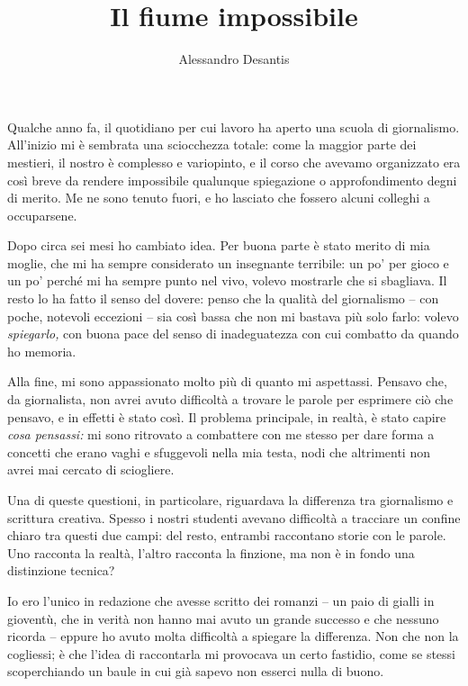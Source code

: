 \documentclass[12pt]{book}
\begin{document}
\title{Il fiume impossibile}
\author{Alessandro Desantis}
\date{}
\maketitle

\cleardoublepage

Qualche anno fa, il quotidiano per cui lavoro ha aperto una scuola di giornalismo. All'inizio mi è sembrata una sciocchezza totale: come la maggior parte dei mestieri, il nostro è complesso e variopinto, e il corso che avevamo organizzato era così breve da rendere impossibile qualunque spiegazione o approfondimento degni di merito. Me ne sono tenuto fuori, e ho lasciato che fossero alcuni colleghi a occuparsene.

Dopo circa sei mesi ho cambiato idea. Per buona parte è stato merito di mia moglie, che mi ha sempre considerato un insegnante terribile: un po' per gioco e un po' perché mi ha sempre punto nel vivo, volevo mostrarle che si sbagliava. Il resto lo ha fatto il senso del dovere: penso che la qualità del giornalismo -- con poche, notevoli eccezioni -- sia così bassa che non mi bastava più solo farlo: volevo \emph{spiegarlo,} con buona pace del senso di inadeguatezza con cui combatto da quando ho memoria.

Alla fine, mi sono appassionato molto più di quanto mi aspettassi. Pensavo che, da giornalista, non avrei avuto difficoltà a trovare le parole per esprimere ciò che pensavo, e in effetti è stato così. Il problema principale, in realtà, è stato capire \emph{cosa pensassi:} mi sono ritrovato a combattere con me stesso per dare forma a concetti che erano vaghi e sfuggevoli nella mia testa, nodi che altrimenti non avrei mai cercato di sciogliere.

Una di queste questioni, in particolare, riguardava la differenza tra giornalismo e scrittura creativa. Spesso i nostri studenti avevano difficoltà a tracciare un confine chiaro tra questi due campi: del resto, entrambi raccontano storie con le parole. Uno racconta la realtà, l'altro racconta la finzione, ma non è in fondo una distinzione tecnica?

Io ero l'unico in redazione che avesse scritto dei romanzi -- un paio di gialli in gioventù, che in verità non hanno mai avuto un grande successo e che nessuno ricorda -- eppure ho avuto molta difficoltà a spiegare la differenza. Non che non la cogliessi; è che l'idea di raccontarla mi provocava un certo fastidio, come se stessi scoperchiando un baule in cui già sapevo non esserci nulla di buono.
\end{document}
